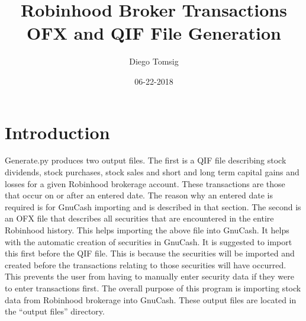 \documentclass{article}
\title{\textbf{Robinhood Broker Transactions OFX and QIF File Generation}}
\author{Diego Tomsig}
\date{06-22-2018}
\begin{document}
        \maketitle
        \newpage
        \tableofcontents
        \newpage
        \section{Introduction}
            Generate.py produces two output files. The first is a QIF file 
            describing stock dividends, stock purchases, stock sales and short 
            and long term capital gains and losses for a given Robinhood 
            brokerage account. These transactions are those that occur on or 
            after an entered date. The reason why an entered date is required is
            for GnuCash importing and is described in that section.
            \newline
            \newline
            The second is an OFX file that describes all securities that are 
            encountered in the entire Robinhood history. This helps importing 
            the above file into GnuCash. It helps with the automatic creation of
            securities in GnuCash. It is suggested to import this first before 
            the QIF file. This is because the securities will be imported and 
            created before the transactions relating to those securities will 
            have occurred. This prevents the user from having to manually enter 
            security data if they were to enter transactions first.
            \newline
            \newline
            The overall purpose of this program is importing stock data from 
            Robinhood brokerage into GnuCash. These output files are located in
            the “output files” directory.
        \newpage
\end{document}
